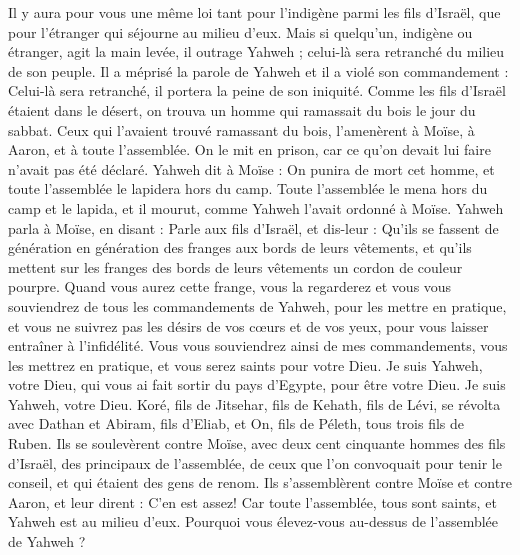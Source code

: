 \begin{multicols}{2}
Il y aura pour vous une même loi tant pour l’indigène parmi les fils d’Israël, que pour l'étranger qui séjourne au milieu d’eux.
Mais si quelqu’un, indigène ou étranger, agit la main levée, il outrage Yahweh ; celui-là sera retranché du milieu de son peuple.
Il a méprisé la parole de Yahweh et il a violé son commandement : Celui-là sera retranché, il portera la peine de son iniquité.
Comme les fils d'Israël étaient dans le désert, on trouva un homme qui ramassait du bois le jour du sabbat.
Ceux qui l’avaient trouvé ramassant du bois, l'amenèrent à Moïse, à Aaron, et à toute l'assemblée.
On le mit en prison, car ce qu'on devait lui faire n’avait pas été déclaré.
Yahweh dit à Moïse : On punira de mort cet homme, et toute l'assemblée le lapidera hors du camp.
Toute l'assemblée le mena hors du camp et le lapida, et il mourut, comme Yahweh l'avait ordonné à Moïse.
Yahweh parla à Moïse, en disant :
Parle aux fils d'Israël, et dis-leur : Qu'ils se fassent de génération en génération des franges aux bords de leurs vêtements, et qu'ils mettent sur les franges des bords de leurs vêtements un cordon de couleur pourpre.
Quand vous aurez cette frange, vous la regarderez et vous vous souviendrez de tous les commandements de Yahweh, pour les mettre en pratique, et vous ne suivrez pas les désirs de vos cœurs et de vos yeux, pour vous laisser entraîner à l’infidélité.
Vous vous souviendrez ainsi de mes commandements, vous les mettrez en pratique, et vous serez saints pour votre Dieu.
Je suis Yahweh, votre Dieu, qui vous ai fait sortir du pays d'Egypte, pour être votre Dieu. Je suis Yahweh, votre Dieu.
\VerseOne{}Koré, fils de Jitsehar, fils de Kehath, fils de Lévi, se révolta avec Dathan et Abiram, fils d'Eliab, et On, fils de Péleth, tous trois fils de Ruben.
Ils se soulevèrent contre Moïse, avec deux cent cinquante hommes des fils d'Israël, des principaux de l'assemblée, de ceux que l’on convoquait pour tenir le conseil, et qui étaient des gens de renom.
Ils s'assemblèrent contre Moïse et contre Aaron, et leur dirent : C’en est assez! Car toute l'assemblée, tous sont saints, et Yahweh est au milieu d'eux. Pourquoi vous élevez-vous au-dessus de l'assemblée de Yahweh ?

\end{multicols}
